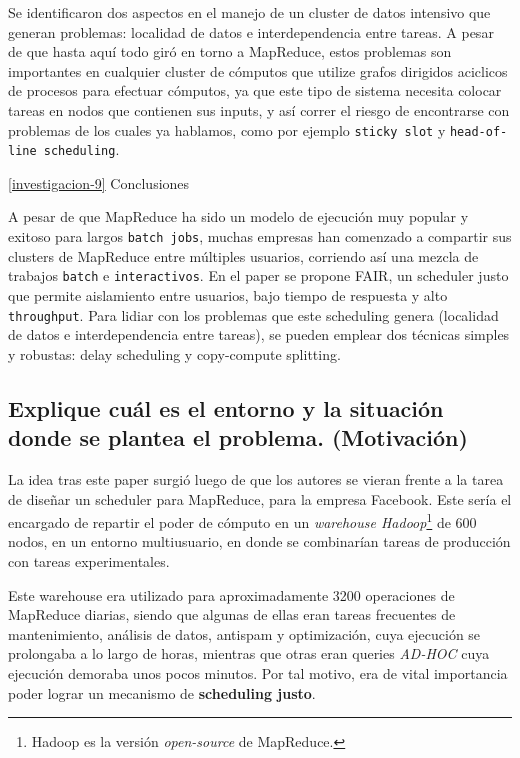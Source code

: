 \documentclass[11pt, a4paper, twoside]{article}
\begin{document}
Se identificaron dos aspectos en el manejo de un cluster de datos 
intensivo que generan problemas: localidad de datos e interdependencia
entre tareas. A pesar de que hasta aquí  todo giró en torno a MapReduce, estos 
problemas son importantes en cualquier cluster de cómputos que utilize
grafos dirigidos aciclicos de procesos para efectuar cómputos, ya que este
tipo de sistema necesita colocar tareas en nodos que contienen sus inputs, y
así correr el riesgo de encontrarse con problemas de los cuales ya hablamos,
como por ejemplo \texttt{sticky slot}  y \texttt{head-of-line scheduling}.

\ref{investigacion-9} Conclusiones

A pesar de que MapReduce ha sido un modelo de ejecución muy popular y exitoso
para largos \texttt{batch jobs}, muchas empresas han comenzado a compartir 
sus clusters de MapReduce entre múltiples usuarios, corriendo así una mezcla
de trabajos \texttt{batch} e \texttt{interactivos}. En el paper se propone
FAIR, un scheduler justo que permite aislamiento entre usuarios, bajo tiempo
de respuesta y alto \texttt{throughput}. Para lidiar con los problemas que este 
scheduling genera (localidad de datos e interdependencia entre tareas), 
se pueden emplear dos técnicas simples y robustas: delay scheduling y 
copy-compute splitting.

\clearpage
\subsection {\footnotesize Explique cuál es el entorno y la situación donde se plantea el problema. (Motivación)}
\label{investigacion-1}

La idea tras este paper surgió luego de que los autores se vieran frente a la
tarea de diseñar un scheduler para MapReduce, para la empresa Facebook. Este
sería el encargado de repartir el poder de cómputo en un \emph{warehouse
Hadoop}\footnote{Hadoop es la versión \emph{open-source} de MapReduce.} de 600
nodos, en un entorno multiusuario, en donde se combinarían tareas de producción
con tareas experimentales.

Este warehouse era utilizado para aproximadamente 3200 operaciones de MapReduce
diarias, siendo que algunas de ellas eran tareas frecuentes de mantenimiento,
análisis de datos, antispam y optimización, cuya ejecución se prolongaba a lo
largo de horas, mientras que otras eran queries \emph{AD-HOC} cuya ejecución
demoraba unos pocos minutos. Por tal motivo, era de vital importancia poder
lograr un mecanismo de \textbf{scheduling justo}.
\end{document}
